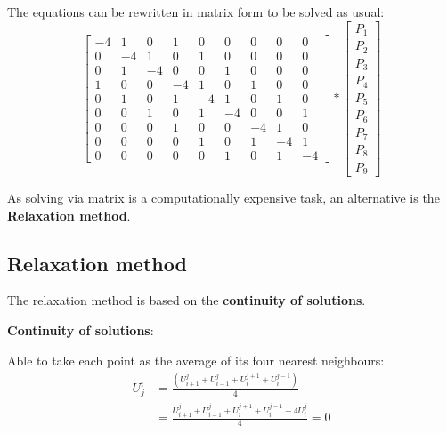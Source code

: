 \documentclass[10pt,a4paper]{article}
\begin{document}
The equations can be rewritten in matrix form to be solved as usual:
$$
\begin{bmatrix}
    -4&1&0&1&0&0&0&0&0 \\
    0&-4&1&0&1&0&0&0&0 \\
    0&1&-4&0&0&1&0&0&0 \\
    1&0&0&-4&1&0&1&0&0 \\
    0&1&0&1&-4&1&0&1&0 \\
    0&0&1&0&1&-4&0&0&1 \\
    0&0&0&1&0&0&-4&1&0 \\
    0&0&0&0&1&0&1&-4&1 \\
    0&0&0&0&0&1&0&1&-4
\end{bmatrix} 
*
\begin{bmatrix}
    P_1 \\
    P_2 \\
    P_3 \\
    P_4 \\
    P_5 \\
    P_6 \\
    P_7 \\
    P_8 \\
    P_9
\end{bmatrix}
$$

As solving via matrix is a computationally expensive task, an alternative is the \textbf{Relaxation method}.

\subsection{Relaxation method}

The relaxation method is based on the \textbf{continuity of solutions}.
\begin{tcolorbox}[breakable,colback=white,colframe=black,width=\dimexpr\textwidth+12mm\relax,enlarge left by=-6mm]
\textbf{Continuity of solutions}: \par 
Able to take each point as the average of its four nearest neighbours: 
    \begin{align*}
        U_j^i &= \frac{(U_{i+1}^j + U_{i-1}^j + U_i^{j+1} + U_i^{j-1})}{4} \\
        &= \frac{U_{i+1}^j + U_{i-1}^j + U_i^{j+1} + U_i^{j-1} - 4U_i^j}{4} = 0
    \end{align*}
\end{tcolorbox}
\end{document}
